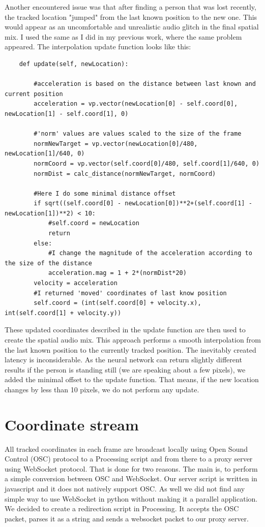 \documentclass{ctuthesis}
\begin{document}
Another encountered issue was that after finding a person that was lost recently, the tracked location "jumped" from the last known position to the new one. This would appear as an uncomfortable and unrealistic audio glitch in the final spatial mix. I used the same as I did in my previous work, where the same problem appeared. The interpolation update function looks like this:


\begin{lstlisting}
    def update(self, newLocation):
    
        #acceleration is based on the distance between last known and current position
        acceleration = vp.vector(newLocation[0] - self.coord[0], newLocation[1] - self.coord[1], 0)
        
        #'norm' values are values scaled to the size of the frame
        normNewTarget = vp.vector(newLocation[0]/480, newLocation[1]/640, 0)
        normCoord = vp.vector(self.coord[0]/480, self.coord[1]/640, 0)
        normDist = calc_distance(normNewTarget, normCoord)
        
        #Here I do some minimal distance offset
        if sqrt((self.coord[0] - newLocation[0])**2+(self.coord[1] - newLocation[1])**2) < 10:
            #self.coord = newLocation
            return
        else:
            #I change the magnitude of the acceleration according to the size of the distance
            acceleration.mag = 1 + 2*(normDist*20)
        velocity = acceleration
        #I returned 'moved' coordinates of last know position
        self.coord = (int(self.coord[0] + velocity.x), int(self.coord[1] + velocity.y))
\end{lstlisting}
\label{interpolation}
These updated coordinates described in the update function are then used to create the spatial audio mix. This approach performs a smooth interpolation from the last known position to the currently tracked position. The inevitably created latency is inconsiderable. As the neural network can return slightly different results if the person is standing still (we are speaking about a few pixels), we added the minimal offset to the update function. That means, if the new location changes by less than 10 pixels, we do not perform any update.

\section{Coordinate stream}
All tracked coordinates in each frame are broadcast locally using Open Sound Control (OSC) protocol to a Processing script and from there to a proxy server using WebSocket protocol. That is done for two reasons. The main is, to perform a simple conversion between OSC and WebSocket. Our server script is written in javascript and it does not natively support OSC. As well we did not find any simple way to use WebSocket in python without making it a parallel application. We decided to create a redirection script in Processing. It accepts the OSC packet, parses it as a string and sends a websocket packet to our proxy server.
\end{document}

